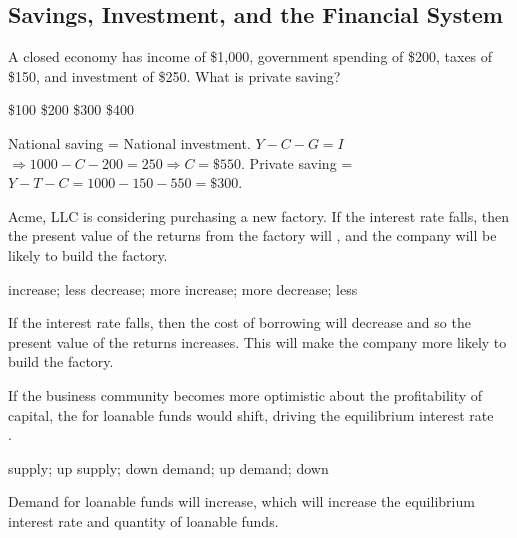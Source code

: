 \documentclass[addpoints,11pt]{exam}
\theoremstyle{definition}
\newcommand{\blank}[0]{\underline{\hspace{3cm}}}
\begin{document}
\subsection*{Savings, Investment, and the Financial System}

\begin{questions}
	

\question A closed economy has income of \$1,000, government spending of \$200, taxes of \$150, and investment of \$250. What is private saving?

\begin{choices}
	\choice \$100
	\choice \$200
	\CorrectChoice \$300
	\choice \$400
\end{choices}

\begin{solution}
	National saving = National investment. $Y - C - G = I$ $\Rightarrow 1000 - C - 200 = 250 \Rightarrow C = \$550$. Private saving = $Y - T - C = 1000 - 150 - 550 = \$300.$
\end{solution}

\question Acme, LLC is considering purchasing a new factory. If the interest rate falls, then the present value of the returns from the factory will \blank, and the company will be \\ \blank likely to build the factory.

\begin{choices}
	\choice increase; less
	\choice decrease; more
	\CorrectChoice increase; more
	\choice decrease; less
\end{choices}


\begin{solution}
	If the interest rate falls, then the cost of borrowing will decrease and so the present value of the returns increases. This will make the company more likely to build the factory.
\end{solution}


\question If the business community becomes more optimistic about the profitability of capital, the \blank for loanable funds would shift, driving the equilibrium interest rate \\  \blank.

\begin{choices}
	\choice supply; up
	\choice supply; down
	\CorrectChoice demand; up
	\choice demand; down
\end{choices}

\begin{solution}
	Demand for loanable funds will increase, which will increase the equilibrium interest rate and quantity of loanable funds.
\end{solution}


\end{questions}
\end{document}
